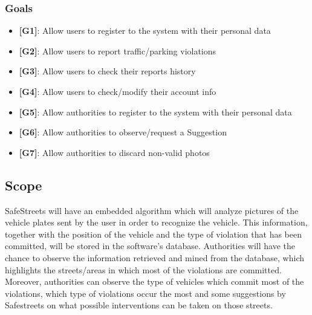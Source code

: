 \documentclass[12pt,a4paper]{article}
\begin{document}
\subsubsection{Goals}
\begin{itemize}
\item {\textbf[}\textbf{G1}{\textbf]}: Allow users to register to the system with their personal data
\item {\textbf[}\textbf{G2}{\textbf]}: Allow users to report traffic/parking violations 
\item {\textbf[}\textbf{G3}{\textbf]}: Allow users to check their reports history
\item {\textbf[}\textbf{G4}{\textbf]}: Allow users to check/modify their account info
\item {\textbf[}\textbf{G5}{\textbf]}: Allow authorities to register to the system with their personal data
\item {\textbf[}\textbf{G6}{\textbf]}: Allow authorities to observe/request a Suggestion
\item {\textbf[}\textbf{G7}{\textbf]}: Allow authorities to discard non-valid photos
\end{itemize}
\subsection{Scope}
SafeStreets will have an embedded algorithm which will analyze pictures of the vehicle plates sent by the user in order to recognize the vehicle. This information, together with the position of the vehicle and the type of violation that has been committed, will be stored in the software's database.
\newline
Authorities will have the chance to observe the information retrieved and mined from the database, which highlights the streets/areas in which most of the violations are committed. \\ Moreover, authorities can observe the type of vehicles which commit most of the violations, which type of violations occur the most and some suggestions by Safestreets on what possible interventions can be taken on those streets.
\end{document}
